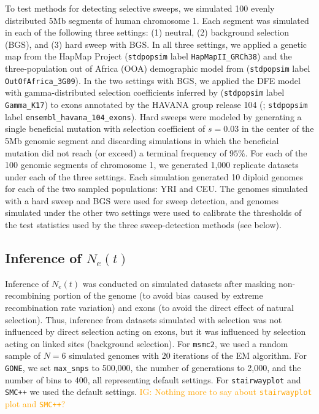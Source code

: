 \documentclass[hidelinks]{article}
\newcommand{\stdpopsim}{\texttt{stdpopsim}\xspace}
\newcommand{\msmc}{\texttt{msmc2}\xspace}
\newcommand{\stairway}{\texttt{stairwayplot}\xspace}
\newcommand{\gone}{\texttt{GONE}\xspace}
\newcommand{\smcpp}{\texttt{SMC++}\xspace}
\newcommand{\igcomment}[1]{\textcolor{orange}{IG: #1}}
\begin{document}
    To test methods for detecting selective sweeps, we simulated 100 evenly distributed 5Mb
    segments of human chromosome 1.
    Each segment was simulated in each of the following three settings:
    (1) neutral, (2) background selection (BGS), and (3) hard sweep with BGS.
    In all three settings, we applied a genetic map from the HapMap Project
    \citep{international2007second} (\stdpopsim label \texttt{HapMapII\_GRCh38}) and
    the three-population out of Africa (OOA) demographic model from
    \cite{gutenkunst2009inferring} (\stdpopsim label \texttt{OutOfAfrica\_3G09}).
    In the two settings with BGS, we applied the DFE model with gamma-distributed selection coefficients inferred by
    \cite{kim2017inference} (\stdpopsim label \texttt{Gamma\_K17}) to exons annotated by the HAVANA group release 104
    (\cite{ensembl2018}; \stdpopsim label \texttt{ensembl\_havana\_104\_exons}).
    Hard sweeps were modeled by generating a single beneficial mutation 
    with selection coefficient of $s = 0.03$ in the center of the 5Mb genomic segment
    and discarding simulations in which the beneficial mutation did not reach (or exceed) a terminal frequency of $95\%$.
    For each of the 100 genomic segments of chromosome 1, we generated 1,000 replicate datasets under each of the three settings.
    Each simulation generated 10 diploid genomes for each of the two sampled populations: YRI and CEU.
    The genomes simulated with a hard sweep and BGS were used for sweep detection,
    and genomes simulated under the other two settings were used to calibrate the thresholds of the test statistics
    used by the three sweep-detection methods (see below).


    \subsection*{Inference of $N_e(t)$}
    Inference of $N_e(t)$ was conducted on simulated datasets after masking non-recombining portion
    of the genome (to avoid bias caused by extreme recombination rate variation)
    and exons (to avoid the direct effect of natural selection).
    Thus, inference from datasets simulated with selection was not influenced by direct selection
    acting on exons, but it was influenced by selection acting on linked sites (background selection).    
    For \msmc \citep{Schiffels2020}, we used a random sample of $N=6$ simulated genomes with 20
    iterations of the EM algorithm.
    For \gone \citep{santiago2020recent}, we set \texttt{max\_snps} to 500,000,
    the number of generations to 2,000, and the number of bins to 400, all representing default settings.
    For \stairway \citep{liu2020stairway} and \smcpp \citep{terhorst2017robust} we used the default settings.
    \igcomment{Nothing more to say about \stairway plot and \smcpp?}
    
\end{document}
